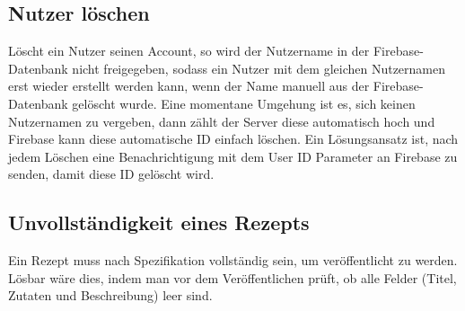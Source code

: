 \subsection{Nutzer löschen}
Löscht ein Nutzer seinen Account, so wird der Nutzername in der Firebase-Datenbank nicht freigegeben, sodass ein Nutzer mit dem gleichen Nutzernamen erst wieder erstellt werden kann, wenn der Name manuell aus der Firebase-Datenbank gelöscht wurde.
Eine momentane Umgehung ist es, sich keinen Nutzernamen zu vergeben, dann zählt der Server diese automatisch hoch und Firebase kann diese automatische ID einfach löschen.
Ein Lösungsansatz ist, nach jedem Löschen eine Benachrichtigung mit dem User ID Parameter an Firebase zu senden, damit diese ID gelöscht wird. 

\subsection{Unvollständigkeit eines Rezepts}
Ein Rezept muss nach Spezifikation vollständig sein, um veröffentlicht zu werden. Lösbar wäre dies, indem man vor dem Veröffentlichen prüft, ob alle Felder (Titel, Zutaten und Beschreibung) leer sind. 